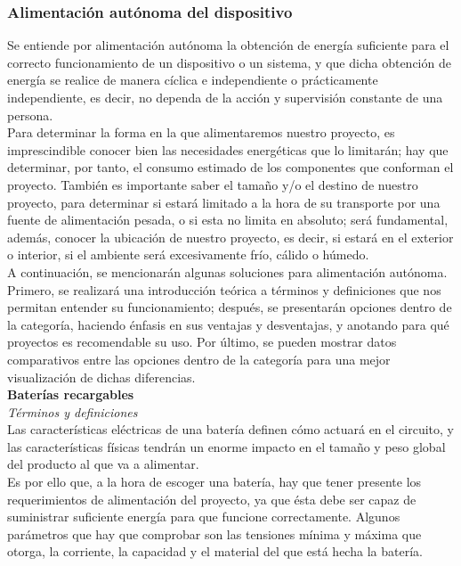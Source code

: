 \documentclass[12pt]{article}
\begin{document}
	\subsubsection{Alimentación autónoma del dispositivo}
	\noindent Se entiende por alimentación autónoma la obtención de energía suficiente para el correcto funcionamiento de un dispositivo o un sistema, y que dicha obtención de energía se realice de manera cíclica e independiente o prácticamente independiente, es decir, no dependa de la acción y supervisión constante de una persona. \\
	
	\noindent Para determinar la forma en la que alimentaremos nuestro proyecto, es imprescindible conocer bien las necesidades energéticas que lo limitarán; hay que determinar, por tanto, el consumo estimado de los componentes que conforman el proyecto. También es importante saber el tamaño y/o el destino de nuestro proyecto, para determinar si estará limitado a la hora de su transporte por una fuente de alimentación pesada, o si esta no limita en absoluto; será fundamental, además, conocer la ubicación de nuestro proyecto, es decir, si estará en el exterior o interior, si el ambiente será excesivamente frío, cálido o húmedo.\\
	
	\noindent A continuación, se mencionarán algunas soluciones para alimentación autónoma. Primero, se realizará una introducción teórica a términos y definiciones que nos permitan entender su funcionamiento; después, se presentarán opciones dentro de la categoría, haciendo énfasis en sus ventajas y desventajas, y anotando para qué proyectos es recomendable su uso. Por último, se pueden mostrar datos comparativos entre las opciones dentro de la categoría para una mejor visualización de dichas diferencias.\\ 
	
	\noindent \textbf{Baterías recargables} \\
	
	\noindent \textit{Términos y definiciones} \\
	
	\noindent Las características eléctricas de una batería definen cómo actuará en el circuito, y las características físicas tendrán un enorme impacto en el tamaño y peso global del producto al que va a alimentar. \\
	\noindent Es por ello que, a la hora de escoger una batería, hay que tener presente los requerimientos de alimentación del proyecto, ya que ésta debe ser capaz de suministrar suficiente energía para que funcione correctamente. Algunos parámetros que hay que comprobar son las tensiones mínima y máxima que otorga, la corriente, la capacidad y el material del que está hecha la batería. \\
	
\end{document}
